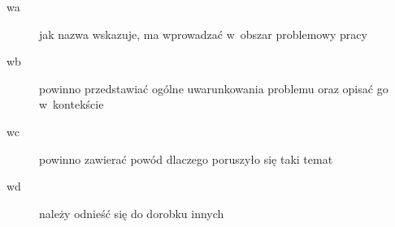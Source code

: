 \documentclass[brudnopis]{xmgr}
\begin{document}
\maketitle
%
\introduction

\begin{description}
\item[wa] \textcolor{wa}{jak nazwa wskazuje, ma wprowadzać 
  w~obszar problemowy pracy}
\item[wb] \textcolor{wb}{powinno przedstawiać ogólne 
  uwarunkowania problemu oraz opisać go w~kontekście}
\item[wc] \textcolor{wc}{powinno zawierać powód dlaczego 
  poruszyło się taki temat}
\item[wd] \textcolor{wd}{należy odnieść się do dorobku innych}
\end{description}
\end{document}
